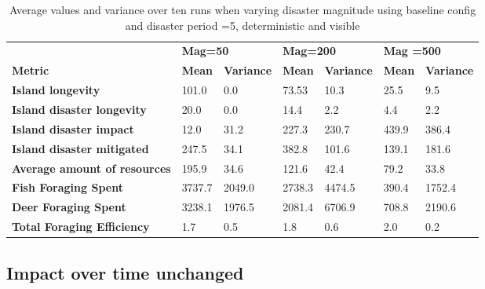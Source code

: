 \begin{center}
\begin{table}[h]
\begin{tabular}{l|ll|ll|ll}
                                     & \multicolumn{2}{l}{\textbf{Mag=50}} & \multicolumn{2}{l}{\textbf{Mag=200}} & \multicolumn{2}{l}{\textbf{Mag =500}} \\
\textbf{Metric}                      & \textbf{Mean}  & \textbf{Variance}  & \textbf{Mean}   & \textbf{Variance}   & \textbf{Mean}   & \textbf{Variance}   \\ \hline
\textbf{Island longevity}            & 101.0          & 0.0                & 73.53           & 10.3               & 25.5            & 9.5                 \\
\textbf{Island disaster longevity}   & 20.0           & 0.0                & 14.4            & 2.2                & 4.4             & 2.2                 \\
\textbf{Island disaster impact}      & 12.0           & 31.2               & 227.3           & 230.7              & 439.9           & 386.4               \\
\textbf{Island disaster mitigated}   & 247.5          & 34.1               & 382.8           & 101.6              & 139.1           & 181.6               \\
\textbf{Average amount of resources} & 195.9          & 34.6               & 121.6           & 42.4               & 79.2            & 33.8                \\
\textbf{Fish Foraging Spent}         & 3737.7         & 2049.0             & 2738.3          & 4474.5             & 390.4           & 1752.4              \\
\textbf{Deer Foraging Spent}         & 3238.1         & 1976.5             & 2081.4          & 6706.9             & 708.8           & 2190.6              \\
\textbf{Total Foraging Efficiency}   & 1.7            & 0.5                & 1.8             & 0.6                & 2.0             & 0.2                
\end{tabular}
\caption{Average values and variance over ten runs when varying disaster magnitude using baseline config and disaster period =5, deterministic and visible}
\label{tab:16_results_and_eval:Disasters:magnitude}
\end{table}
\end{center}

\subsection{Impact over time unchanged}

